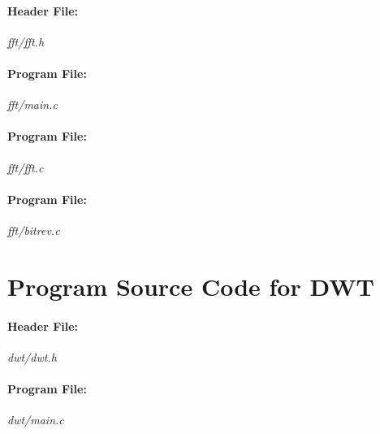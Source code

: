 \documentclass[a4paper,11pt]{article}
\begin{document}
\paragraph{Header File:} \textit{fft/fft.h}
\vspace{5pt}
{\scriptsize
\begin{lgrind}

\end{lgrind}
}

\paragraph{Program File:} \textit{fft/main.c}
\vspace{5pt}
{\scriptsize
\begin{lgrind}

\end{lgrind}
}

\paragraph{Program File:} \textit{fft/fft.c}
\vspace{5pt}
{\scriptsize
\begin{lgrind}

\end{lgrind}
}

\paragraph{Program File:} \textit{fft/bitrev.c}
\vspace{5pt}
{\scriptsize
\begin{lgrind}

\end{lgrind}
}
\clearpage

\section{Program Source Code for DWT} \label{pscdwt}
\paragraph{Header File:} \textit{dwt/dwt.h}
\vspace{5pt}
{\scriptsize
\begin{lgrind}

\end{lgrind}
}

\paragraph{Program File:} \textit{dwt/main.c}
\vspace{5pt}
{\scriptsize
\begin{lgrind}

\end{lgrind}
}
\end{document}
